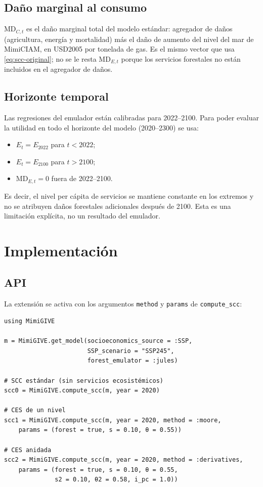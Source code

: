 \documentclass[11pt,a4paper]{article}
\begin{document}
\subsection{Daño marginal al consumo}

\(\mathrm{MD}_{C,t}\) es el daño marginal total del modelo estándar:
agregador de daños (agricultura, energía y mortalidad) más el daño de aumento
del nivel del mar de MimiCIAM, en USD2005 por tonelada de gas. Es el mismo
vector que usa \eqref{eq:scc-original}; no se le resta \(\mathrm{MD}_{E,t}\)
porque los servicios forestales no están incluidos en el agregador de daños.

\subsection{Horizonte temporal}

Las regresiones del emulador están calibradas para 2022--2100. Para poder
evaluar la utilidad en todo el horizonte del modelo (2020--2300) se usa:
\begin{itemize}
  \item \(E_t = E_{2022}\) para \(t<2022\);
  \item \(E_t = E_{2100}\) para \(t>2100\);
  \item \(\mathrm{MD}_{E,t}=0\) fuera de 2022--2100.
\end{itemize}
Es decir, el nivel per cápita de servicios se mantiene constante en los
extremos y no se atribuyen daños forestales adicionales después de 2100.
Esta es una limitación explícita, no un resultado del emulador.

\section{Implementación}

\subsection{API}

La extensión se activa con los argumentos \texttt{method} y \texttt{params}
de \texttt{compute\_scc}:
\begin{lstlisting}
using MimiGIVE

m = MimiGIVE.get_model(socioeconomics_source = :SSP,
                       SSP_scenario = "SSP245",
                       forest_emulator = :jules)

# SCC estándar (sin servicios ecosistémicos)
scc0 = MimiGIVE.compute_scc(m, year = 2020)

# CES de un nivel
scc1 = MimiGIVE.compute_scc(m, year = 2020, method = :moore,
    params = (forest = true, s = 0.10, θ = 0.55))

# CES anidada
scc2 = MimiGIVE.compute_scc(m, year = 2020, method = :derivatives,
    params = (forest = true, s = 0.10, θ = 0.55,
              s2 = 0.10, θ2 = 0.58, i_pc = 1.0))
\end{lstlisting}
\end{document}
